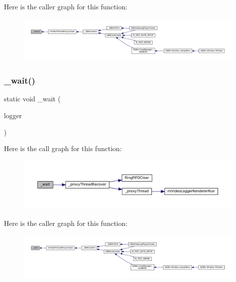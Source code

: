 Here is the caller graph for this function\+:
\nopagebreak
\begin{figure}[H]
\begin{center}
\leavevmode
\includegraphics[width=350pt]{thread-proxy_8c_ade51ba82a597a9089d4e639a5fca76fa_icgraph}
\end{center}
\end{figure}
\mbox{\label{thread-proxy_8c_adbc17597459e4e98b86b4b1821d1040f}} 
\subsubsection{\texorpdfstring{\+\_\+wait()}{\_wait()}}
{\footnotesize\ttfamily static void \+\_\+wait (\begin{DoxyParamCaption}\item[{struct m\+Video\+Logger $\ast$}]{logger }\end{DoxyParamCaption})\hspace{0.3cm}{\ttfamily [static]}}

Here is the call graph for this function\+:
\nopagebreak
\begin{figure}[H]
\begin{center}
\leavevmode
\includegraphics[width=350pt]{thread-proxy_8c_adbc17597459e4e98b86b4b1821d1040f_cgraph}
\end{center}
\end{figure}
Here is the caller graph for this function\+:
\nopagebreak
\begin{figure}[H]
\begin{center}
\leavevmode
\includegraphics[width=350pt]{thread-proxy_8c_adbc17597459e4e98b86b4b1821d1040f_icgraph}
\end{center}
\end{figure}
\mbox{\label{thread-proxy_8c_afb1377b4c16e0b5aa347a274d5323ec6}} 
